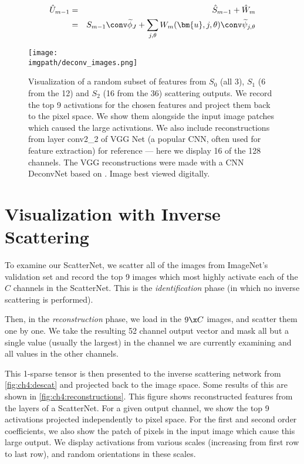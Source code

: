 \begin{eqnarray}
  \label{eq:ch4:x_hat}
  \hat{U}_{m-1} &=& \hat{S}_{m-1} + \hat{W}_{m} \\
              &=& S_{m-1} \conv \widetilde{\phi}_J + \sum_{j, \theta} W_{m}(\bm{u}, j,
  \theta) \conv \widetilde{\psi}_{j, \theta}
\end{eqnarray}

\begin{figure}[tp]
  \centering
  \texttt{[image: \\imgpath/deconv\_images.png]}
  \caption{Visualization of a random subset of features from $S_0$ (all
  3), $S_1$ (6 from the 12) and $S_2$ (16 from the 36) scattering
    outputs. We record the top 9 activations for the chosen features and project
    them back to the pixel space. We show them alongside the input image patches
    which caused the large activations. We also include reconstructions from
    layer conv2\_2 of VGG Net \cite{simonyan_very_2014}(a popular CNN, often used
    for feature extraction) for reference --- here we display 16 of the 128
    channels. The VGG reconstructions were made with a CNN DeconvNet based on
    \cite{zeiler_visualizing_2014}. Image best viewed digitally.}
  \label{fig:ch4:reconstructions}
\end{figure}

\section{Visualization with Inverse Scattering}
\label{sec:ch4:visualization}

To examine our ScatterNet, we scatter all of the images from ImageNet's validation
set and record the top 9 images which most highly activate each of the $C$
channels in the ScatterNet. This is the \emph{identification} phase (in which no
inverse scattering is performed). 

Then, in the \emph{reconstruction}
phase, we load in the $9\x C$ images, and scatter them one by one. We take the
resulting 52 channel output vector and mask all but a single value (usually the
largest) in the channel we are currently examining and all values in the other
channels.

This 1-sparse tensor is then presented to the inverse scattering network from
\autoref{fig:ch4:descat} and projected back to the image space. Some results of this
are shown in \autoref{fig:ch4:reconstructions}. This figure shows reconstructed
features from the layers of a ScatterNet. For a given output channel, we show
the top 9 activations projected independently to pixel space. For the first and
second order coefficients, we also show the patch of pixels in the input image
which cause this large output. We display activations from various scales
(increasing from first row to last row), and random orientations in these
scales. 

